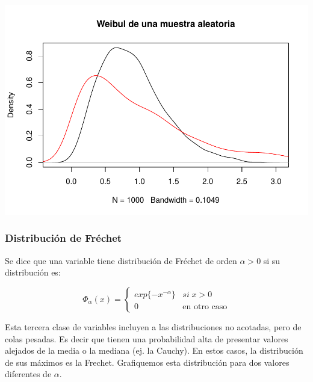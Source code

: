\documentclass[
  oneside]{book}
\begin{document}
\includegraphics{extremales_files/figure-latex/unnamed-chunk-10-1.pdf}

\hypertarget{distribuciuxf3n-de-fruxe9chet}{%
\subsubsection{Distribución de
Fréchet}\label{distribuciuxf3n-de-fruxe9chet}}

Se dice que una variable tiene distribución de Fréchet de orden
\(\alpha>0\) si su distribución es:

\[
\Phi_{\alpha}(x)=\begin{cases}
exp\{-x^{-\alpha}\} & si\;x>0\\
0 & \text{en otro caso}
\end{cases}
\]

Esta tercera clase de variables incluyen a las distribuciones no
acotadas, pero de colas pesadas. Es decir que tienen una probabilidad
alta de presentar valores alejados de la media o la mediana (ej. la
Cauchy). En estos casos, la distribución de sus máximos es la Frechet.
Grafiquemos esta distribución para dos valores diferentes de \(\alpha\).
\end{document}
